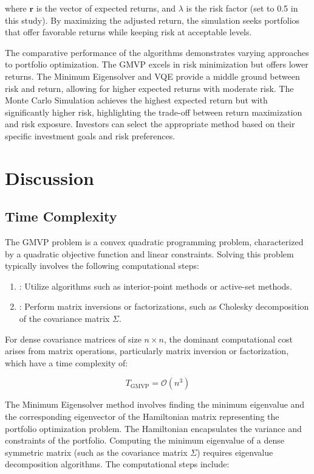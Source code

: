 \documentclass[%
 reprint,
 amsmath,amssymb,
 aps,
]{revtex4-2}
\begin{document}
where $\mathbf{r}$ is the vector of expected returns, and $\lambda$ is the risk factor (set to 0.5 in this study). By maximizing the adjusted return, the simulation seeks portfolios that offer favorable returns while keeping risk at acceptable levels.

The comparative performance of the algorithms demonstrates varying approaches to portfolio optimization. The GMVP excels in risk minimization but offers lower returns. The Minimum Eigensolver and VQE provide a middle ground between risk and return, allowing for higher expected returns with moderate risk. The Monte Carlo Simulation achieves the highest expected return but with significantly higher risk, highlighting the trade-off between return maximization and risk exposure. Investors can select the appropriate method based on their specific investment goals and risk preferences.




\section{Discussion}
\subsection{Time Complexity}
The GMVP problem is a convex quadratic programming problem, characterized by a quadratic objective function and linear constraints. Solving this problem typically involves the following computational steps:

\begin{enumerate}
    \item {}: Utilize algorithms such as interior-point methods or active-set methods.
    \item {}: Perform matrix inversions or factorizations, such as Cholesky decomposition of the covariance matrix $\Sigma$.
\end{enumerate}

For dense covariance matrices of size $n \times n$, the dominant computational cost arises from matrix operations, particularly matrix inversion or factorization, which have a time complexity of:

\begin{equation}
T_{\text{GMVP}} = \mathcal{O}(n^3)
\end{equation}

The Minimum Eigensolver method involves finding the minimum eigenvalue and the corresponding eigenvector of the Hamiltonian matrix representing the portfolio optimization problem. The Hamiltonian encapsulates the variance and constraints of the portfolio. Computing the minimum eigenvalue of a dense symmetric matrix (such as the covariance matrix $\Sigma$) requires eigenvalue decomposition algorithms. The computational steps include:
\end{document}
